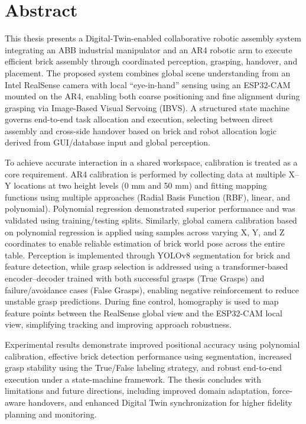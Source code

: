 \documentclass[15pt, a4paper]{extreport}
\begin{document}

\chapter*{Abstract}

This thesis presents a Digital-Twin-enabled collaborative robotic assembly system integrating an ABB industrial manipulator and an AR4 robotic arm to execute efficient brick assembly through coordinated perception, grasping, handover, and placement. The proposed system combines global scene understanding from an Intel RealSense camera with local ``eye-in-hand'' sensing using an ESP32-CAM mounted on the AR4, enabling both coarse positioning and fine alignment during grasping via Image-Based Visual Servoing (IBVS). A structured state machine governs end-to-end task allocation and execution, selecting between direct assembly and cross-side handover based on brick and robot allocation logic derived from GUI/database input and global perception.

\setlength{\parskip}{1em}
To achieve accurate interaction in a shared workspace, calibration is treated as a core requirement. AR4 calibration is performed by collecting data at multiple X--Y locations at two height levels (0 mm and 50 mm) and fitting mapping functions using multiple approaches (Radial Basis Function (RBF), linear, and polynomial). Polynomial regression demonstrated superior performance and was validated using training/testing splits. Similarly, global camera calibration based on polynomial regression is applied using samples across varying X, Y, and Z coordinates to enable reliable estimation of brick world pose across the entire table. Perception is implemented through YOLOv8 segmentation for brick and feature detection, while grasp selection is addressed using a transformer-based encoder--decoder trained with both successful grasps (True Grasps) and failure/avoidance cases (False Grasps), enabling negative reinforcement to reduce unstable grasp predictions. During fine control, homography is used to map feature points between the RealSense global view and the ESP32-CAM local view, simplifying tracking and improving approach robustness.

\setlength{\parskip}{1em}
Experimental results demonstrate improved positional accuracy using polynomial calibration, effective brick detection performance using segmentation, increased grasp stability using the True/False labeling strategy, and robust end-to-end execution under a state-machine framework. The thesis concludes with limitations and future directions, including improved domain adaptation, force-aware handovers, and enhanced Digital Twin synchronization for higher fidelity planning and monitoring.
\newpage
\end{document}
